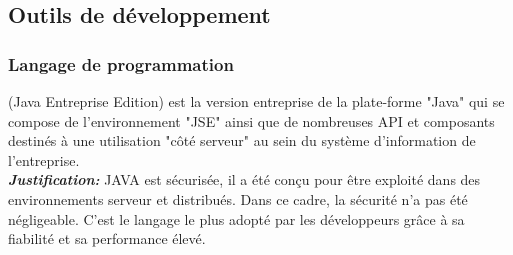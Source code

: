 \documentclass[a4paper]{report}
\begin{document}
\begin{spacing}{2}
\subsection{Outils de développement }
\subsubsection{Langage de programmation}
\begin{minipage}{0.18\textwidth}
	\begin{minipage}{\linewidth}
\end{minipage}
\end{minipage}
\hfill
\begin{minipage}{0.75\textwidth}
(Java Entreprise Edition) est la version entreprise de la plate-forme "Java" qui se compose de l'environnement "JSE" ainsi que de nombreuses API et composants destinés à une utilisation "côté serveur" au sein du système d'information de l'entreprise.\\
\textbf{\textit{Justification:}} JAVA est sécurisée, il a été conçu pour être exploité dans des environnements serveur et distribués. Dans ce cadre, la sécurité n’a pas été négligeable. C’est le langage le plus adopté par les développeurs grâce à sa fiabilité et sa performance élevé. \\
\end{minipage}\\

\end{spacing}
\end{document}
